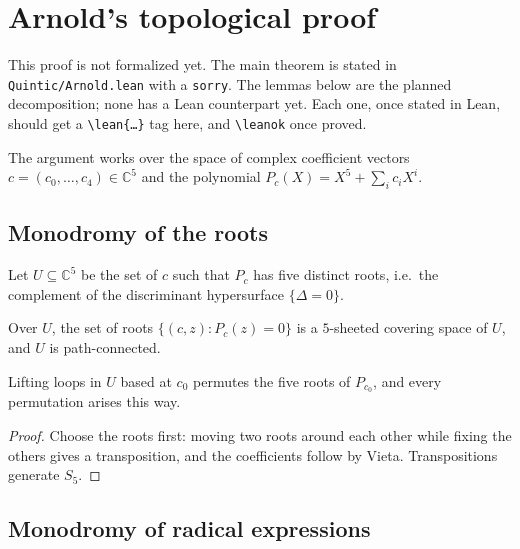 \chapter{Arnold's topological proof}
\label{chap:arnold}

This proof is not formalized yet. The main theorem is stated in
\texttt{Quintic/Arnold.lean} with a \texttt{sorry}. The lemmas below are the planned
decomposition; none has a Lean counterpart yet. Each one, once stated in Lean, should get a
\texttt{\textbackslash lean\{\dots\}} tag here, and \texttt{\textbackslash leanok} once proved.

The argument works over the space of complex coefficient vectors
$c = (c_0, \dots, c_4) \in \mathbb{C}^5$ and the polynomial
$P_c(X) = X^5 + \sum_i c_i X^i$.

\section{Monodromy of the roots}

\begin{definition}
  \label{def:config-space}
  Let $U \subseteq \mathbb{C}^5$ be the set of $c$ such that $P_c$ has five distinct roots,
  i.e.\ the complement of the discriminant hypersurface $\{\Delta = 0\}$.
\end{definition}

\begin{lemma}
  \label{lem:roots-covering}
  Over $U$, the set of roots $\{(c, z) : P_c(z) = 0\}$ is a $5$-sheeted covering space of $U$,
  and $U$ is path-connected.
\end{lemma}

\begin{lemma}
  \label{lem:roots-monodromy}
  Lifting loops in $U$ based at $c_0$ permutes the five roots of $P_{c_0}$, and every
  permutation arises this way.
\end{lemma}

\begin{proof}
  Choose the roots first: moving two roots around each other while fixing the others gives
  a transposition, and the coefficients follow by Vieta. Transpositions generate $S_5$.
\end{proof}

\section{Monodromy of radical expressions}

